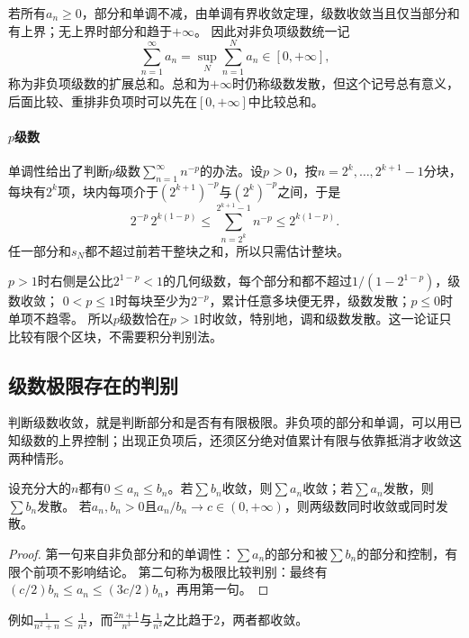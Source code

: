 若所有$a_n\geq0$，部分和单调不减，由单调有界收敛定理，级数收敛当且仅当部分和有上界；无上界时部分和趋于$+\infty$。
因此对非负项级数统一记
\[
 \sum_{n=1}^\infty a_n=\sup_N\sum_{n=1}^Na_n\in[0,+\infty],
\]
称为非负项级数的扩展总和。总和为$+\infty$时仍称级数发散，但这个记号总有意义，后面比较、重排非负项时可以先在$[0,+\infty]$中比较总和。

\paragraph{$p$级数}
单调性给出了判断$p$级数$\sum_{n=1}^\infty n^{-p}$的办法。设$p>0$，按$n=2^k,\ldots,2^{k+1}-1$分块，每块有$2^k$项，块内每项介于$(2^{k+1})^{-p}$与$(2^k)^{-p}$之间，于是
\[
 2^{-p}\,2^{k(1-p)}\leq\sum_{n=2^k}^{2^{k+1}-1}n^{-p}\leq2^{k(1-p)}.
\]
任一部分和$s_N$都不超过前若干整块之和，所以只需估计整块。

$p>1$时右侧是公比$2^{1-p}<1$的几何级数，每个部分和都不超过$1/(1-2^{1-p})$，级数收敛；
$0<p\leq1$时每块至少为$2^{-p}$，累计任意多块便无界，级数发散；$p\leq0$时单项不趋零。
所以$p$级数恰在$p>1$时收敛，特别地，调和级数发散。这一论证只比较有限个区块，不需要积分判别法。

\subsection{级数极限存在的判别}
\label{sec:ru-series-tests}
\label{sec:analysis-series-tests}

判断级数收敛，就是判断部分和是否有有限极限。非负项的部分和单调，可以用已知级数的上界控制；出现正负项后，还须区分绝对值累计有限与依靠抵消才收敛这两种情形。

\begin{theorem}[正项级数的比较判别]
\label{thm:ru-series-comparison}
设充分大的$n$都有$0\leq a_n\leq b_n$。若$\sum b_n$收敛，则$\sum a_n$收敛；若$\sum a_n$发散，则$\sum b_n$发散。
若$a_n,b_n>0$且$a_n/b_n\to c\in(0,+\infty)$，则两级数同时收敛或同时发散。
\end{theorem}
\begin{proof}
第一句来自非负部分和的单调性：$\sum a_n$的部分和被$\sum b_n$的部分和控制，有限个前项不影响结论。
第二句称为极限比较判别：最终有$(c/2)b_n\leq a_n\leq(3c/2)b_n$，再用第一句。
\end{proof}
例如$\frac{1}{n^2+n}\leq\frac1{n^2}$，而$\frac{2n+1}{n^3}$与$\frac1{n^2}$之比趋于$2$，两者都收敛。

